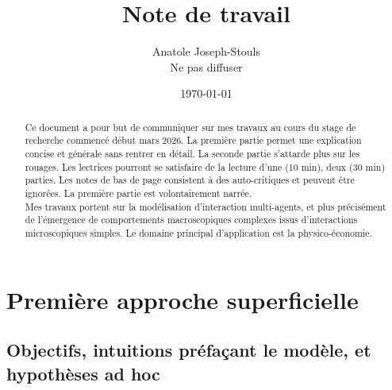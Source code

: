 \documentclass[10pt,a4paper]{article}
\title{Note de travail}
\author{Anatole Joseph-Stouls \\ \tiny{Ne pas diffuser}}
\date{\today}
\begin{document}
\hypersetup{pageanchor=false}
\begin{titlepage}
\maketitle
\thispagestyle{empty}

\begin{abstract}
	Ce document a pour but de communiquer sur mes travaux au cours du stage de recherche commencé début mars 2026. La première partie permet une explication concise et générale sans rentrer en détail. La seconde partie s'attarde plus sur les rouages. Les lectrices pourront se satisfaire de la lecture d'une (10 min), deux (30 min) parties. Les notes de bas de page consistent à des auto-critiques et peuvent être ignorées. La première partie est volontairement narrée. \\
	Mes travaux portent sur la modélisation d’interaction multi-agents, et plus précisément de l'émergence de comportements macroscopiques complexes issus d’interactions microscopiques simples. Le domaine principal d'application est la physico-économie.  
\end{abstract}
\tableofcontents
\end{titlepage}

\clearpage
\hypersetup{pageanchor=true}
\twocolumn

\section{Première approche superficielle}

\subsection{Objectifs, intuitions préfaçant le modèle, et hypothèses ad hoc}
\end{document}
